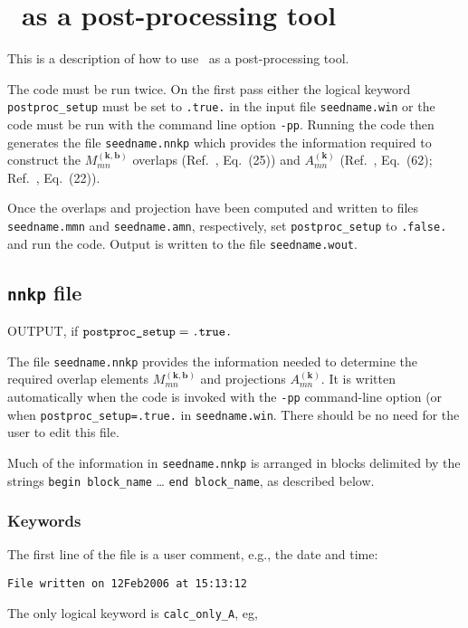\chapter{\wannier\ as a post-processing tool} \label{ch:wann-pp}

This is a description of how to use \wannier\ as a
post-processing tool. 

The code must be run twice. On the first pass either the logical keyword
\verb#postproc_setup# must be set to \verb#.true.# in the input file
\verb#seedname.win# or the code must be run with the command line
option \verb#-pp#.  Running the code then generates the file
\verb#seedname.nnkp# which provides the information required to 
construct the $M_{mn}^{(\mathbf{k,b})}$ overlaps (Ref.~\cite{MV},
Eq.~(25)) and $A_{mn}^{(\mathbf{k})}$ (Ref.~\cite{MV}, Eq.~(62);
Ref.~\cite{SMV}, Eq.~(22)).

Once the overlaps and projection have been computed and written to
files \verb#seedname.mmn# and \verb#seedname.amn#, respectively,
set \verb#postproc_setup# to \verb#.false.# and run the code. Output is
written to the file \verb#seedname.wout#.


\section{{\tt nnkp} file}

OUTPUT, if $\verb#postproc_setup#=\verb#.true.#$

The file \verb#seedname.nnkp# provides the information needed to
determine the required overlap elements $M_{mn}^{(\mathbf{k,b})}$ and
projections $A_{mn}^{(\mathbf{k})}$. It is written automatically when
the code is invoked with the \verb#-pp# command-line option (or when
\verb#postproc_setup=.true.# in \verb#seedname.win#. There should be
no need for the user to edit this file.

Much of the information in \verb#seedname.nnkp# is arranged in blocks
delimited by the strings \verb#begin block_name# \ldots
\verb#end block_name#, as described below. 


\subsection{Keywords}
The first line of the file is a user comment, e.g., the date and time:

\verb#File written on 12Feb2006 at 15:13:12#

\noindent 
The only logical keyword is \verb#calc_only_A#, eg,

